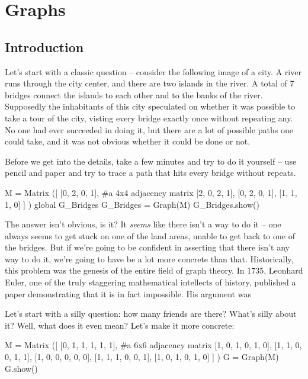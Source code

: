 \chapter{Graphs}

\section{Introduction}

Let's start with a classic question -- consider the following image of a city.
A river runs through the city center, and there are two islands in the river.
A total of 7 bridges connect the islands to each other and to the banks of the
river.  Supposedly the inhabitants of this city speculated on whether it was
possible to take a tour of the city, visting every bridge exactly once without
repeating any.  No one had ever succeeded in doing it, but there are a lot of possible paths one could take, and it was not obvious whether it could be done or not.  


Before we get into the details, take a few minutes and try to do it yourself --
use pencil and paper and try to trace a path that hits every bridge without
repeats.


\begin{sageverbatim}
M = Matrix ([ [0, 2, 0, 1],   #a 4x4 adjacency matrix
              [2, 0, 2, 1], 
              [0, 2, 0, 1],
              [1, 1, 1, 0] ] )
global G_Bridges
G_Bridges = Graph(M)
G_Bridges.show()
\end{sageverbatim}



The answer isn't obvious, is it?  It \emph{seems} like there isn't a way to do
it -- one always seems to get stuck on one of the land areas, unable to get
back to one of the bridges.  But if we're going to be confident in asserting
that there isn't any way to do it, we're going to have be a lot more concrete
than that.  Historically, this problem was the genesis of the entire field of
graph theory.  In 1735, Leonhard Euler, one of the truly staggering
mathematical intellects of history, published a paper demonstrating that it is in fact impossible.  His argument was  


Let's start with a silly question:  how many friends are there?
What's silly about it?  Well, what does it even mean?  Let's make it
more concrete:

\begin{sageverbatim}
M = Matrix ([ [0, 1, 1, 1, 1, 1],   #a 6x6 adjacency matrix
              [1, 0, 1, 0, 1, 0], 
              [1, 1, 0, 0, 1, 1],
              [1, 0, 0, 0, 0, 0],
              [1, 1, 1, 0, 0, 1],
              [1, 0, 1, 0, 1, 0] ] )
G = Graph(M)
G.show()
\end{sageverbatim}

